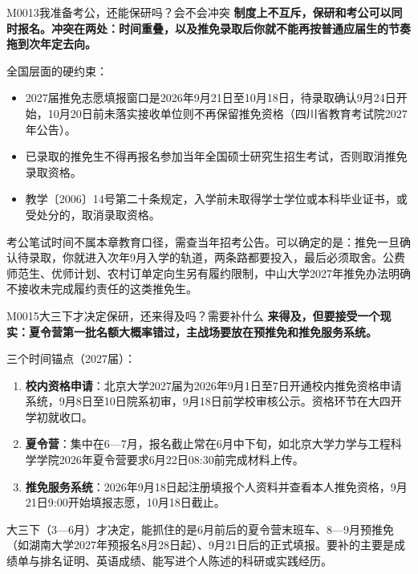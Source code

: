 \begin{qa}{M0013}{我准备考公，还能保研吗？会不会冲突}
\textbf{制度上不互斥，保研和考公可以同时报名。冲突在两处：时间重叠，以及推免录取后你就不能再按普通应届生的节奏拖到次年定去向。}

全国层面的硬约束：

\begin{itemize}
  \item 2027届推免志愿填报窗口是2026年9月21日至10月18日，待录取确认9月24日开始，10月20日前未落实接收单位则不再保留推免资格（四川省教育考试院2027年公告）。
  \item 已录取的推免生不得再报名参加当年全国硕士研究生招生考试，否则取消推免录取资格。
  \item 教学〔2006〕14号第二十条规定，入学前未取得学士学位或本科毕业证书，或受处分的，取消录取资格。
\end{itemize}

考公笔试时间不属本章教育口径，需查当年招考公告。可以确定的是：推免一旦确认待录取，你就进入次年9月入学的轨道，两条路都要投入，最后必须取舍。公费师范生、优师计划、农村订单定向生另有履约限制，中山大学2027年推免办法明确不接收未完成履约责任的这类推免生。
\end{qa}

\begin{qa}{M0015}{大三下才决定保研，还来得及吗？需要补什么}
\textbf{来得及，但要接受一个现实：夏令营第一批名额大概率错过，主战场要放在预推免和推免服务系统。}

三个时间锚点（2027届）：

\begin{enumerate}
  \item \textbf{校内资格申请}：北京大学2027届为2026年9月1日至7日开通校内推免资格申请系统，9月8日至10日院系初审，9月18日前学校审核公示。资格环节在大四开学初就收口。
  \item \textbf{夏令营}：集中在6—7月，报名截止常在6月中下旬，如北京大学力学与工程科学学院2026年夏令营要求6月22日08:30前完成材料上传。
  \item \textbf{推免服务系统}：2026年9月18日起注册填报个人资料并查看本人推免资格，9月21日9:00开始填报志愿，10月18日截止。
\end{enumerate}

大三下（3—6月）才决定，能抓住的是6月前后的夏令营末班车、8—9月预推免（如湖南大学2027年预报名8月28日起）、9月21日后的正式填报。要补的主要是成绩单与排名证明、英语成绩、能写进个人陈述的科研或实践经历。
\end{qa}

